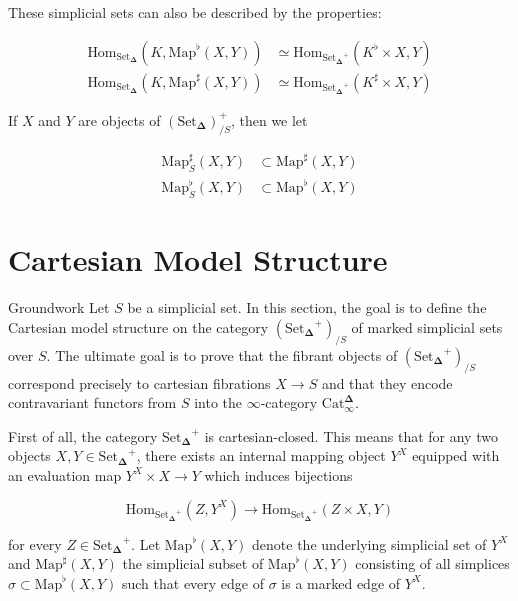 \documentclass{beamer}[9pt]
\newcommand{\8}{\ensuremath{\infty}}
\newcommand{\SSet}{\ensuremath{\text{Set}_{\boldsymbol{\Delta}}}}
\newcommand{\Catinfdel}{\ensuremath{\text{Cat}^{\boldsymbol{\Delta}}_{\infty}}}
\newcommand{\Map}{\ensuremath{\text{Map}}}
\newcommand{\Hom}{\ensuremath{\text{Hom}}}
\begin{document}
\begin{frame}
  These simplicial sets can also be described by the properties:

  \begin{align*}
    \Hom_{\SSet}(K, \Map^\flat(X, Y))  & \simeq \Hom_{\SSet^+}(K^\flat\times X, Y)  \\
    \Hom_{\SSet}(K, \Map^\sharp(X, Y)) & \simeq \Hom_{\SSet^+}(K^\sharp\times X, Y)
  \end{align*}

  If $X$ and $Y$ are objects of $(\SSet)^+_{/S}$, then we let

  \begin{align*}
    \Map_S^\sharp(X, Y) & \subset \Map^\sharp(X, Y) \\
    \Map_S^\flat(X, Y)  & \subset \Map^\flat(X, Y)
  \end{align*}
\end{frame}

\section{Cartesian Model Structure}

\begin{frame}{Groundwork}
  Let $S$ be a simplicial set. In this section, the goal is to define the Cartesian model structure on the category $(\SSet^+)_{/S}$ of marked simplicial sets over $S$. The ultimate goal is to prove that the fibrant objects of $(\SSet^+)_{/S}$ correspond precisely to cartesian fibrations $X \rightarrow S$ and that they encode contravariant functors from $S$ into the \8-category \Catinfdel.
\end{frame}

\begin{frame}
  First of all, the category $\SSet^+$ is cartesian-closed. This means that for any two objects $X, Y\in \SSet^+$, there exists an internal mapping object $Y^X$ equipped with an evaluation map $Y^X\times X \rightarrow Y$ which induces bijections

  $$
    \Hom_{\SSet^+}(Z, Y^X) \rightarrow \Hom_{\SSet^+}(Z\times X, Y)
  $$

  for every $Z \in \SSet^+$. Let $\Map^\flat(X, Y)$ denote the underlying simplicial set of $Y^X$ and $\Map^\sharp(X, Y)$ the simplicial subset of $\Map^\flat(X, Y)$ consisting of all simplices $\sigma\subset \Map^\flat(X, Y)$ such that every edge of $\sigma$ is a marked edge of $Y^X$.
\end{frame}
\end{document}

